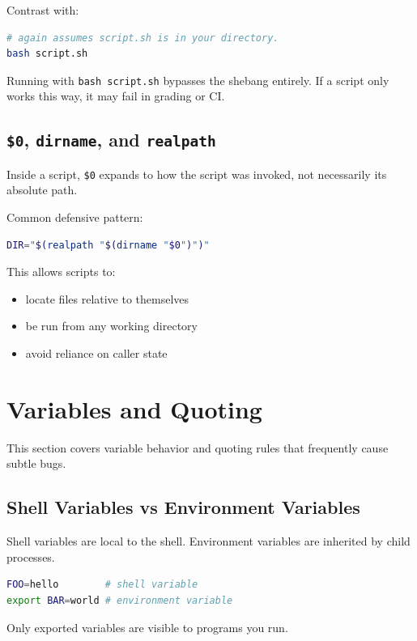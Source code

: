 \documentclass{../juni}
\begin{document}
Contrast with:

\begin{lstlisting}[language=bash]
# again assumes script.sh is in your directory.
bash script.sh
\end{lstlisting}

Running with \texttt{bash script.sh} bypasses the shebang entirely. If a script
only works this way, it may fail in grading or CI.

\subsection{\texttt{\$0}, \texttt{dirname}, and \texttt{realpath}}

Inside a script, \texttt{\$0} expands to how the script was invoked, not
necessarily its absolute path.

Common defensive pattern:

\begin{lstlisting}[language=bash]
DIR="$(realpath "$(dirname "$0")")"
\end{lstlisting}

This allows scripts to:
\begin{itemize}
  \item locate files relative to themselves
  \item be run from any working directory
  \item avoid reliance on caller state
\end{itemize}

\newpage
\section{Variables and Quoting}

This section covers variable behavior and quoting rules that frequently cause
subtle bugs.

\subsection{Shell Variables vs Environment Variables}

Shell variables are local to the shell. Environment variables are inherited by
child processes.

\begin{lstlisting}[language=bash]
FOO=hello        # shell variable
export BAR=world # environment variable
\end{lstlisting}

Only exported variables are visible to programs you run.
\end{document}
